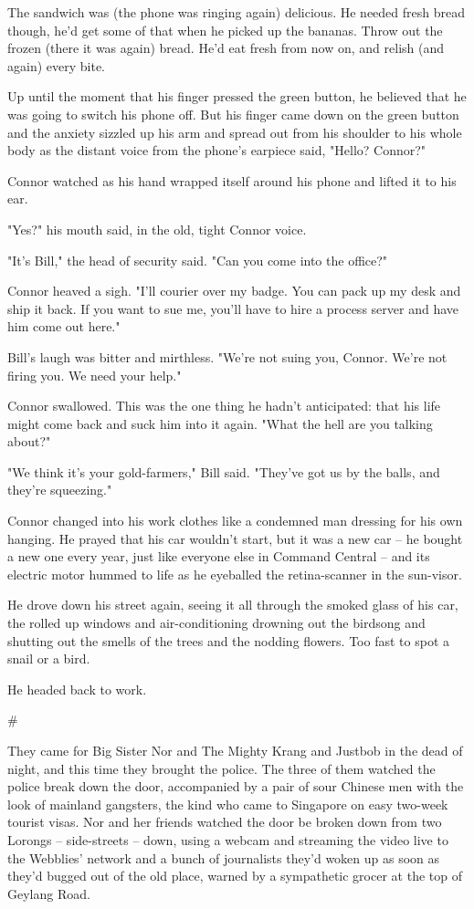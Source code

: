 The sandwich was (the phone was ringing again) delicious. He needed
fresh bread though, he'd get some of that when he picked up the
bananas. Throw out the frozen (there it was again) bread. He'd eat
fresh from now on, and relish (and again) every bite.

Up until the moment that his finger pressed the green button, he
believed that he was going to switch his phone off. But his finger
came down on the green button and the anxiety sizzled up his arm
and spread out from his shoulder to his whole body as the distant
voice from the phone's earpiece said, "Hello? Connor?"

Connor watched as his hand wrapped itself around his phone and
lifted it to his ear.

"Yes?" his mouth said, in the old, tight Connor voice.

"It's Bill," the head of security said. "Can you come into the
office?"

Connor heaved a sigh. "I'll courier over my badge. You can pack up
my desk and ship it back. If you want to sue me, you'll have to
hire a process server and have him come out here."

Bill's laugh was bitter and mirthless. "We're not suing you,
Connor. We're not firing you. We need your help."

Connor swallowed. This was the one thing he hadn't anticipated:
that his life might come back and suck him into it again. "What the
hell are you talking about?"

"We think it's your gold-farmers," Bill said. "They've got us by
the balls, and they're squeezing."

Connor changed into his work clothes like a condemned man dressing
for his own hanging. He prayed that his car wouldn't start, but it
was a new car -- he bought a new one every year, just like everyone
else in Command Central -- and its electric motor hummed to life as
he eyeballed the retina-scanner in the sun-visor.

He drove down his street again, seeing it all through the smoked
glass of his car, the rolled up windows and air-conditioning
drowning out the birdsong and shutting out the smells of the trees
and the nodding flowers. Too fast to spot a snail or a bird.

He headed back to work.

\#

They came for Big Sister Nor and The Mighty Krang and Justbob in
the dead of night, and this time they brought the police. The three
of them watched the police break down the door, accompanied by a
pair of sour Chinese men with the look of mainland gangsters, the
kind who came to Singapore on easy two-week tourist visas. Nor and
her friends watched the door be broken down from two Lorongs --
side-streets -- down, using a webcam and streaming the video live
to the Webblies' network and a bunch of journalists they'd woken up
as soon as they'd bugged out of the old place, warned by a
sympathetic grocer at the top of Geylang Road.

